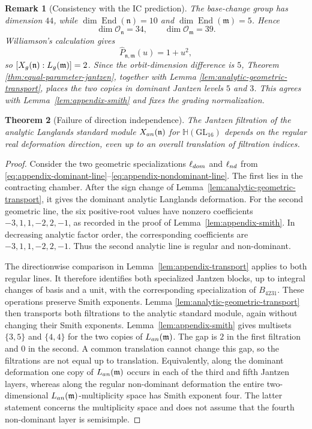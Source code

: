 \documentclass[10pt,a4paper]{amsart}
\newtheorem{theorem}{Theorem}[section]
\newtheorem{remark}[theorem]{Remark}
\newcommand{\Hh}{\mathbb H}
\begin{document}
\begin{remark}[Consistency with the IC prediction]
The base-change group has dimension $44$, while
$\dim\operatorname{End}(\mathfrak n)=10$ and
$\dim\operatorname{End}(\mathfrak m)=5$.  Hence
\[
 \dim\mathcal O_{\mathfrak n}=34,\qquad
 \dim\mathcal O_{\mathfrak m}=39.
\]
Williamson's calculation gives
\[
 \widehat P_{\mathfrak n,\mathfrak m}(u)=1+u^2,
\]
so $[X_{\rm g}(\mathfrak n):L_{\rm g}(\mathfrak m)]=2$.  Since the
orbit-dimension difference is $5$, Theorem
\ref{thm:equal-parameter-jantzen}, together with Lemma
\ref{lem:analytic-geometric-transport}, places the two copies in dominant
Jantzen levels $5$ and $3$.  This agrees with
Lemma~\ref{lem:appendix-smith} and fixes the grading normalization.
\end{remark}

\begin{theorem}[Failure of direction independence]
\label{thm:direction-counterexample}
The Jantzen filtration of the analytic Langlands standard module
$X_{\rm an}(\mathfrak n)$ for $\Hh(\mathrm{GL}_{16})$ depends on the regular
real deformation direction, even up to an overall translation of filtration
indices.
\end{theorem}

\begin{proof}
Consider the two geometric specializations $\ell_{\rm dom}$ and
$\ell_{\rm nd}$ from
\eqref{eq:appendix-dominant-line}--\eqref{eq:appendix-nondominant-line}.
The first lies in the contracting chamber.  After the sign change of
Lemma~\ref{lem:analytic-geometric-transport}, it gives the dominant analytic
Langlands deformation.  For the second geometric line, the six positive-root
values have nonzero coefficients
$-3,1,1,-2,2,-1$, as recorded in the proof of
Lemma~\ref{lem:appendix-smith}.  In decreasing analytic factor order, the
corresponding coefficients are $-3,1,1,-2,2,-1$.  Thus the second analytic
line is regular and non-dominant.

The directionwise comparison in
Lemma~\ref{lem:appendix-transport} applies to both regular lines.  It therefore
identifies both specialized Jantzen blocks, up to integral changes of basis
and a unit, with the corresponding specialization of $B_{4231}$.  These
operations preserve Smith exponents.  Lemma
\ref{lem:analytic-geometric-transport} then transports both filtrations to
the analytic standard module, again without changing their Smith exponents.
Lemma~\ref{lem:appendix-smith} gives
multisets $\{3,5\}$ and $\{4,4\}$ for the two copies of
$L_{\rm an}(\mathfrak m)$.  The gap is $2$ in the first filtration and $0$ in the
second.  A common translation cannot change this gap, so the filtrations are
not equal up to translation.  Equivalently, along the dominant deformation
one copy of $L_{\rm an}(\mathfrak m)$ occurs in each of the third and fifth
Jantzen layers, whereas along the regular non-dominant deformation the
entire two-dimensional $L_{\rm an}(\mathfrak m)$-multiplicity space has
Smith exponent four.
The latter statement concerns the multiplicity space and does not assume
that the fourth non-dominant layer is semisimple.
\end{proof}
\end{document}
